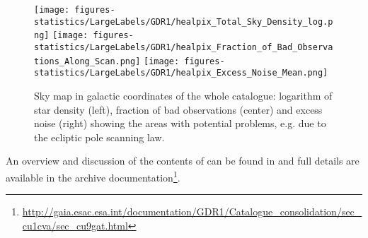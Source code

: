      \begin{figure*}[!h]
	  \centering
	    \texttt{[image: figures-statistics/LargeLabels/GDR1/healpix\_Total\_Sky\_Density\_log.png]}
        \texttt{[image: figures-statistics/LargeLabels/GDR1/healpix\_Fraction\_of\_Bad\_Observations\_Along\_Scan.png]}
        \texttt{[image: figures-statistics/LargeLabels/GDR1/healpix\_Excess\_Noise\_Mean.png]}
  	      \caption{Sky map in galactic coordinates of the whole catalogue: logarithm of star density (left), 
	      fraction of bad observations (center) and
	      excess noise (right) showing the areas with potential problems, e.g. due to the ecliptic pole scanning law.} 
              \label{fig:GDR1healpix_stat_TotalSkyDensityLogCount-GAL_HealpixMapSAM}
     \end{figure*}

An overview and discussion of the contents of {} can be found in \cite{DPACP-8} and full details are available in the archive documentation\footnote{\scriptsize\url{http://gaia.esac.esa.int/documentation/GDR1/Catalogue_consolidation/sec_cu1cva/sec_cu9gat.html}}. 


\newcommand\gdrtotnum{\ensuremath{1\,142\,679\,769}}
\newcommand\gdrsecnum{\ensuremath{1\,140\,622\,719}}
\newcommand\tgasnum{\ensuremath{2\,057\,050}}
\newcommand\tycnum{\ensuremath{1\,963\,415}}
\newcommand\hipnum{\ensuremath{93\,635}}
\newcommand\varnum{\ensuremath{3194}}
\newcommand\cepnum{\ensuremath{599}}
\newcommand\cepnumnew{\ensuremath{43}}
\newcommand\rrlnum{\ensuremath{2595}}
\newcommand\rrlnumnew{\ensuremath{343}}


